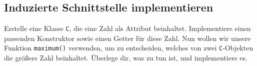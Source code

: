 \subsection{Induzierte Schnittstelle implementieren}
Erstelle eine Klasse \lstinline{C}, die eine Zahl als Attribut beinhaltet. Implementiere einen passenden Konstruktor sowie einen Getter für diese Zahl. Nun wollen wir unsere Funktion  \lstinline{maximum()} verwenden, um zu entscheiden, welches von zwei \lstinline{C}-Objekten die größere Zahl beinhaltet.
Überlege dir, was zu tun ist, und implementiere es.

